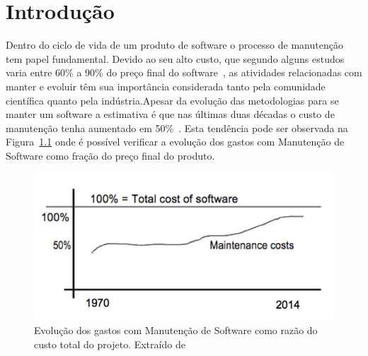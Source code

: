 \chapter{Introdução}
\label{ch:intro}

Dentro do ciclo de vida de um produto de software o processo de manutenção tem
papel fundamental. Devido ao seu alto custo, que segundo alguns estudos varia
entre 60\% a 90\% do preço final do software~\cite{kaur2015review}, as
atividades relacionadas com manter e evoluir têm sua importância considerada
tanto pela comunidade científica quanto pela indústria.Apesar da evolução das
metodologias para se manter um software a estimativa é que nas últimas duas
décadas o custo de manutenção tenha aumentado em
50\%~\cite{koskinen2010software}. Esta tendência pode ser observada na
Figura~\ref{fig:software-maintence-costs} onde é possível verificar a evolução
dos gastos com Manutenção de Software como fração do preço final do produto.


\begin{figure}[htpb]
\centering
\includegraphics[width=0.6\linewidth]
				{./chapter-intro/img/software-maintence-costs.png}
\caption{Evolução dos gastos com Manutenção de Software como razão do custo
    total do projeto. Extraído de~\cite{engelbertink2010save}}
\label{fig:software-maintence-costs}
\end{figure}

